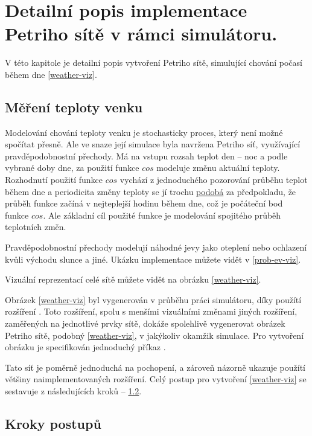 \chapter{Detailní popis implementace Petriho sítě v rámci simulátoru.}
\label{chap:postup}

V této kapitole je detailní popis vytvoření Petriho sítě, simulující chování počasí během dne \ref{weather-viz}.

\section{Měření teploty venku}
\label{sec:mereni-teploty}
Modelování chování teploty venku je stochasticky proces, který není možné spočítat přesně. Ale ve snaze její simulace byla navržena Petriho síť, využívající pravděpodobnostní přechody. Má na vstupu rozsah teplot den -- noc a podle vybrané doby dne, za použití funkce $cos$ modeluje změnu aktuální teploty. Rozhodnutí použití funkce $cos$ vychází z jednoduchého pozorování průběhu teplot během dne a periodicita změny teploty se jí trochu \href{https://forecast.weather.gov/MapClick.php?lat=42.3758&lon=-71.1187&lg=english&FcstType=graphical}{podobá} za předpokladu, že průběh funkce začíná v nejteplejší hodinu během dne, což je počáteční bod funkce $cos$. Ale základní cíl použité funkce je modelování spojitého průběh teplotních změn.

Pravděpodobnostní přechody modelují náhodné jevy jako oteplení nebo ochlazení kvůli východu slunce a jiné. Ukázku implementace můžete vidět v \ref{prob-ev-viz}.

Vizuální reprezentací celé sítě můžete vidět na obrázku \ref{weather-viz}.

Obrázek \ref{weather-viz} byl vygenerován v průběhu práci simulátoru, díky použítí rozšíření \href{https://www.ibisc.univ-evry.fr/~fpommereau/SNAKES/API/plugins/gv.html}{}. Toto rozšíření, spolu s menšími vizuálními změnami jiných rozšíření, zaměřených na jednotlivé prvky sítě, dokáže spolehlivě vygenerovat obrázek Petriho sítě, podobný \ref{weather-viz}, v jakýkoliv okamžik simulace. Pro vytvoření obrázku je specifikován jednoduchý příkaz .


Tato síť je poměrně jednoduchá na pochopení, a zároveň názorně ukazuje použítí většiny naimplementovaných rozšíření. Celý postup pro vytvoření \ref{weather-viz} se sestavuje z následujících kroků -- \ref{sec:process-steps}.

\section{Kroky postupů}
\label{sec:process-steps}

